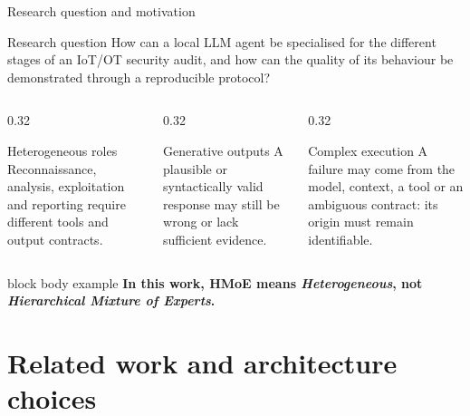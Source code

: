 \documentclass[aspectratio=169,10pt]{beamer}
\newcommand{\keymessage}[1]{%
  \begin{beamercolorbox}[rounded=true,sep=1.1ex,wd=\linewidth]{block body example}
    \centering\bfseries #1
  \end{beamercolorbox}
}
\begin{document}
\begin{frame}{Research question and motivation}
  \begin{alertblock}{Research question}
    \centering
    \large How can a local LLM agent be specialised for the different stages of
    an IoT/OT security audit, and how can the quality of its behaviour be
    demonstrated through a reproducible protocol?
  \end{alertblock}

  \vspace{0.6em}
  \begin{columns}[T,onlytextwidth]
    \begin{column}{0.32\textwidth}
      \begin{block}{Heterogeneous roles}
        Reconnaissance, analysis, exploitation and reporting require different
        tools and output contracts.
      \end{block}
    \end{column}
    \begin{column}{0.32\textwidth}
      \begin{block}{Generative outputs}
        A plausible or syntactically valid response may still be wrong or lack
        sufficient evidence.
      \end{block}
    \end{column}
    \begin{column}{0.32\textwidth}
      \begin{block}{Complex execution}
        A failure may come from the model, context, a tool or an ambiguous
        contract: its origin must remain identifiable.
      \end{block}
    \end{column}
  \end{columns}

  \vfill
  \keymessage{In this work, HMoE means \emph{Heterogeneous}, not \emph{Hierarchical Mixture of Experts}.}
\end{frame}

\section{Related work and architecture choices}
\end{document}

